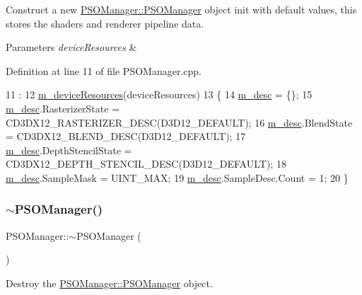 Construct a new \mbox{\hyperlink{class_p_s_o_manager_a0ada0797c36bd51e30d46af47e2785a3}{P\+S\+O\+Manager\+::\+P\+S\+O\+Manager}} object init with default values, this stores the shaders and renderer pipeline data. 


\begin{DoxyParams}{Parameters}
{\em device\+Resources} & \\
\hline
\end{DoxyParams}


Definition at line 11 of file P\+S\+O\+Manager.\+cpp.


\begin{DoxyCode}
11                                                                              :
12     \mbox{\hyperlink{class_p_s_o_manager_a0ea4be81328632e56d764e065b2af0af}{m\_deviceResources}}(deviceResources)
13 \{
14     \mbox{\hyperlink{class_p_s_o_manager_ac5a7e346b2d641709d7146f5a0f45dee}{m\_desc}} = \{\};
15     \mbox{\hyperlink{class_p_s_o_manager_ac5a7e346b2d641709d7146f5a0f45dee}{m\_desc}}.RasterizerState = CD3DX12\_RASTERIZER\_DESC(D3D12\_DEFAULT);
16     \mbox{\hyperlink{class_p_s_o_manager_ac5a7e346b2d641709d7146f5a0f45dee}{m\_desc}}.BlendState = CD3DX12\_BLEND\_DESC(D3D12\_DEFAULT);
17     \mbox{\hyperlink{class_p_s_o_manager_ac5a7e346b2d641709d7146f5a0f45dee}{m\_desc}}.DepthStencilState = CD3DX12\_DEPTH\_STENCIL\_DESC(D3D12\_DEFAULT);
18     \mbox{\hyperlink{class_p_s_o_manager_ac5a7e346b2d641709d7146f5a0f45dee}{m\_desc}}.SampleMask = UINT\_MAX;
19     \mbox{\hyperlink{class_p_s_o_manager_ac5a7e346b2d641709d7146f5a0f45dee}{m\_desc}}.SampleDesc.Count = 1;
20 \}
\end{DoxyCode}
\mbox{\label{class_p_s_o_manager_a4f35a02a56881d6624f36c916d4dface}} 
\subsubsection{\texorpdfstring{$\sim$\+P\+S\+O\+Manager()}{~PSOManager()}}
{\footnotesize\ttfamily P\+S\+O\+Manager\+::$\sim$\+P\+S\+O\+Manager (\begin{DoxyParamCaption}{ }\end{DoxyParamCaption})}



Destroy the \mbox{\hyperlink{class_p_s_o_manager_a0ada0797c36bd51e30d46af47e2785a3}{P\+S\+O\+Manager\+::\+P\+S\+O\+Manager}} object. 



